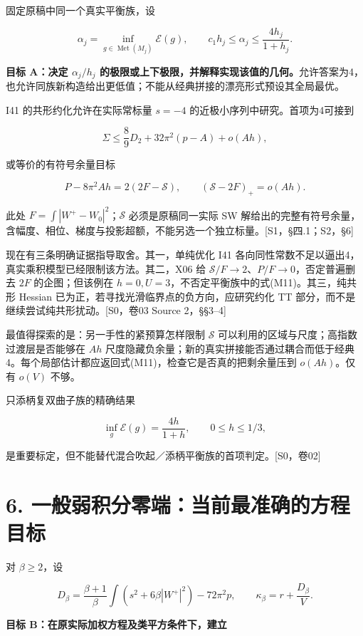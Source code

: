\documentclass[UTF8,a4paper,11pt,fontset=fandol]{ctexart}
\begin{document}
固定原稿中同一个真实平衡族，设

\[
\alpha_j=\inf_{g\in\operatorname{Met}(M_j)}\mathcal E(g),\qquad
c_1h_j\le\alpha_j\le\frac{4h_j}{1+h_j}.
\]

\textbf{目标 A：决定 \(\alpha_j/h_j\)
的极限或上下极限，并解释实现该值的几何。}允许答案为4，也允许同族新构造给出更低值；不能从经典拼接的漂亮形式预设其全局最优。

I41 的共形约化允许在实际常标量 \(s=-4\)
的近极小序列中研究。首项为4可接到

\[
\Sigma\le\frac89D_2+32\pi^2(p-A)+o(Ah),
\tag{M10}
\]

或等价的有符号余量目标

\[
P-8\pi^2Ah=2(2F-\mathscr S),
\qquad
\boxed{(\mathscr S-2F)_+=o(Ah)}.
\tag{M11}
\]

此处 \(F=\int|W^+-W_0|^2\)；\(\mathscr S\) 必须是原稿同一实际 SW
解给出的完整有符号余量，含幅度、相位、梯度与投影超额，不能另选一个独立标量。{[}S1，§四.1；S2，§6{]}

现在有三条明确证据指导取舍。其一，单纯优化 I41
各向同性常数不足以逼出4，真实乘积模型已经限制该方法。其二，X06 给
\(\mathscr S/F\to2\)、\(P/F\to0\)，否定普遍删去 \(2F\) 的企图；但该例在
\(h=0,U=3\)，不否定平衡族中的式(M11)。其三，纯共形 Hessian
已为正，若寻找光滑临界点的负方向，应研究约化 TT
部分，而不是继续尝试纯共形扰动。{[}S0，卷03 Source 2，§§3--4{]}

最值得探索的是：另一手性的紧预算怎样限制 \(\mathscr S\)
可以利用的区域与尺度；高指数过渡层是否能够在 \(Ah\)
尺度隐藏负余量；新的真实拼接能否通过耦合而低于经典4。每个局部估计都应返回式(M11)，检查它是否真的把剩余量压到
\(o(Ah)\)。仅有 \(o(V)\) 不够。

只添柄复双曲子族的精确结果

\[
\inf_g\mathcal E(g)=\frac{4h}{1+h},\qquad0\le h\le1/3,
\]

是重要标定，但不能替代混合吹起／添柄平衡族的首项判定。{[}S0，卷02{]}

\section{6.
一般弱积分零端：当前最准确的方程目标}\label{ux4e00ux822cux5f31ux79efux5206ux96f6ux7aefux5f53ux524dux6700ux51c6ux786eux7684ux65b9ux7a0bux76eeux6807}

对 \(\beta\ge2\)，设

\[
D_\beta=\frac{\beta+1}{\beta}
\int(s^2+6\beta|W^+|^2)-72\pi^2p,
\qquad\kappa_\beta=r+\frac{D_\beta}{V}.
\]

\textbf{目标 B：在原实际加权方程及类平方条件下，建立}
\end{document}
